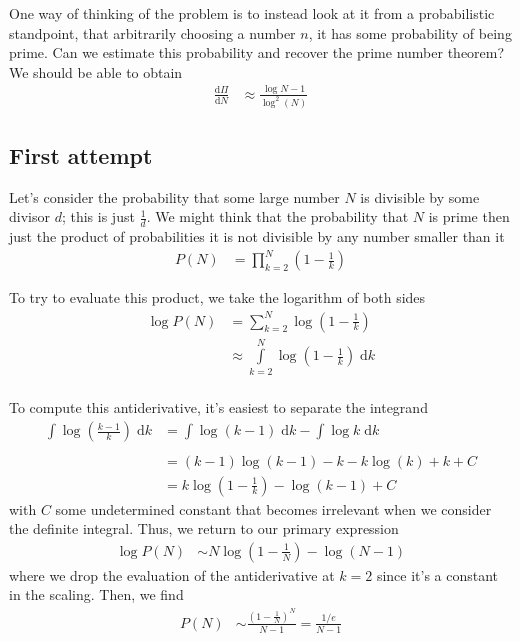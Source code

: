 \documentclass[12pt]{report}
\newcommand{\rd}[2]{\frac{\mathrm{d}#1}{\mathrm{d}#2}}
\begin{document}
One way of thinking of the problem is to instead look at it from a probabilistic
standpoint, that arbitrarily choosing a number $n$, it has some probability of
being prime. Can we estimate this probability and recover the prime number
theorem? We should be able to obtain
\begin{align}
    \rd{\Pi}{N} &\approx \frac{\log N - 1}{\log^2(N)}
\end{align}

\subsection{First attempt}

Let's consider the probability that some large number $N$ is divisible by some
divisor $d$; this is just $\frac{1}{d}$. We might think that the probability
that $N$ is prime then just the product of probabilities it is not divisible by
any number smaller than it
\begin{align}
    P(N) &= \prod_{k=2}^N \left( 1 - \frac{1}{k} \right)\label{2-prod}
\end{align}

To try to evaluate this product, we take the logarithm of both sides
\begin{align}
    \log P(N) &= \sum\limits_{k=2}^{N} \log \left( 1 - \frac{1}{k}
    \right)\\\label{2-intapprox}
    &\approx \int\limits_{k=2}^{N}\log \left( 1 - \frac{1}{k} \right)\;\mathrm{d}k\\
\end{align}

To compute this antiderivative, it's easiest to separate the integrand
\begin{align}
    \int\limits_{}^{}\log\left( \frac{k-1}{k} \right)\;\mathrm{d}k &=
    \int\limits_{}^{}\log (k-1)\;\mathrm{d}k - \int\limits_{}^{}\log
    k\;\mathrm{d}k\\
    &= (k-1)\log(k-1) - k - k\log(k) + k + C\\
    &= k\log\left( 1 - \frac{1}{k} \right) - \log(k-1) + C
\end{align}
with $C$ some undetermined constant that becomes irrelevant when we consider the
definite integral. Thus, we return to our primary expression
\begin{align}
    \log P(N) &\sim N\log\left( 1 - \frac{1}{N} \right) - \log(N - 1)
\end{align}
where we drop the evaluation of the antiderivative at $k=2$ since it's a
constant in the scaling. Then, we find
\begin{align}
    P(N) &\sim \frac{\left( 1 - \frac{1}{N} \right)^N}{N-1} =
    \frac{1/e}{N-1}
\end{align}
\end{document}
